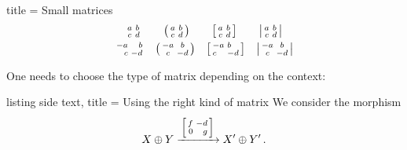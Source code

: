 \documentclass[a4paper, 10pt, headings=standardclasses, oneside, bibliography=totocnumbered]{scrbook}
\begin{document}
\begin{tcblisting}{title = {Small matrices}}
\begin{gather*}
  \begin{smallmatrix}
    a & b \\
    c & d
  \end{smallmatrix}
  \qquad
  \begin{psmallmatrix}
    a & b \\
    c & d
  \end{psmallmatrix}
  \qquad
  \begin{bsmallmatrix}
    a & b \\
    c & d
  \end{bsmallmatrix}
  \qquad
  \begin{vsmallmatrix}
    a & b \\
    c & d
  \end{vsmallmatrix}
\\
  \begin{smallmatrix*}[r]
    -a &  b \\
      c & -d
  \end{smallmatrix*}
  \quad
  \begin{psmallmatrix*}[c]
    -a &  b \\
      c & -d
  \end{psmallmatrix*}
  \quad
  \begin{bsmallmatrix*}[l]
    -a &  b \\
      c & -d
  \end{bsmallmatrix*}
  \quad
  \begin{vsmallmatrix}
    -a &  b \\
      c & -d
  \end{vsmallmatrix}
\end{gather*}
\end{tcblisting}
One needs to choose the type of matrix depending on the context:
\begin{tcblisting}{listing side text, title = {Using the right kind of matrix}}
We consider the morphism
\[
  X \oplus Y
  \xrightarrow{\,
    \begin{bsmallmatrix*}[r]
      f & -d \\
      0 &  g
    \end{bsmallmatrix*}
    \,
  }
  X' \oplus Y' \,.
\]
\end{tcblisting}



\backmatter


\printbibliography
\end{document}
